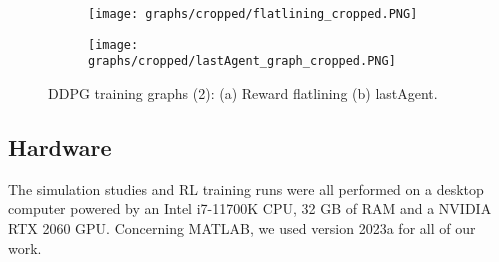 \begin{figure}[h]
	\begin{subfigure}{\textwidth} %
		\centering
		\texttt{[image: graphs/cropped/flatlining\_cropped.PNG]}  %
		\caption{}
		\label{figure: RL c}
	\end{subfigure}
	\begin{subfigure}{\textwidth}
		\centering
		\texttt{[image: graphs/cropped/lastAgent\_graph\_cropped.PNG]}  
		\caption{}
		\label{figure: RL d}
	\end{subfigure} 
	\caption[DDPG training graphs (2)]{DDPG training graphs (2):  (a) Reward flatlining (b) lastAgent.}
	\label{figure: DDPG learning graphs 2}
\end{figure}


\subsection{Hardware}
The simulation studies and RL training runs were all performed on a desktop computer powered by an Intel i7-11700K CPU, 32 GB of RAM and a NVIDIA RTX 2060 GPU.
Concerning MATLAB, we used version 2023a for all of our work.

